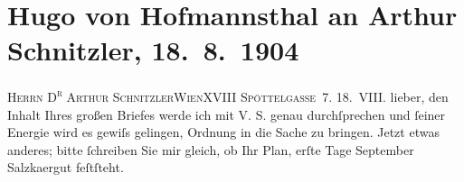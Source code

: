 

         
         \renewcommand{\erwaehntePersonen}{Personen: Gertrude von Hofmannsthal, Christiane von Hofmannsthal, Raimund von Hofmannsthal, Franz von Hofmannsthal, Olga Schnitzler, Robert Gilbert Vansittart}
         \renewcommand{\erwaehnteOrte}{Orte: Bad Aussee, Bad Ischl, Edmund-Weiß-Gasse, Rodaun, Salzkammergut, Wien, XVIII., Währing}
         \renewcommand{\erwaehnteWerke}{}
               \section[Hugo von Hofmannsthal an Arthur Schnitzler, 18. 8. 1904]{ Hugo von Hofmannsthal an Arthur Schnitzler, 18. 8. 1904}\nopagebreak{}\rehead{ }\begin{ledgroupsized}[t]{13cm}\normalsize\beginnumbering \toendnotes[C]{\smallbreak\pagebreak[2]} 
\toendnotes[C]{\smallbreak}\pstart{}{\pb}\textsc{Herrn D\textsuperscript{r} Arthur
                  Schnitzler}\pend{}\pstart{}\textsc{Wien}\pend{}\pstart{}\textsc{XVIII Spöttelgasse 7}.\pend{}{\bigskip}\pstart
           \raggedleft{}{\pb}18. VIII.\pend
           \pstart
           lieber, den Inhalt Ihres großen Briefes werde ich mit \textsc{V. S.} genau
               durchſprechen und ſeiner Energie wird es gewiſs gelingen, Ordnung in die Sache zu
               bringen. Jetzt etwas anderes; bitte ſchreiben Sie mir gleich, ob Ihr Plan,
                  erſte Tage September{ }Salzka{\geminationm}ergut feſtſteht.

\end{ledgroupsized}
